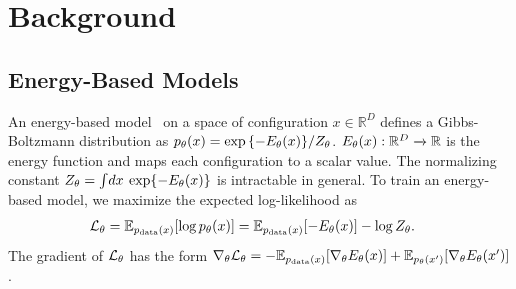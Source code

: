 \documentclass[tablecaption=bottom,wcp]{jmlr} %
\begin{document}
\section{Background}
\label{sec:background}

\subsection{Energy-Based Models}
An energy-based model~\cite{lecun2006tutorial} on a space of configuration $x\in\mathbb{R}^D$ defines a Gibbs-Boltzmann distribution as $p_\theta(x) = {\exp \left\{- E_\theta(x)\right\}} / {Z_\theta}$.
$E_\theta(x) : \mathbb{R}^D \xrightarrow[]{} \mathbb{R}$ is the energy function and maps each configuration to a scalar value. The normalizing constant $Z_\theta = \int \!dx \: \exp \{- E_\theta(x)\}$ is intractable in general.
To train an energy-based model, we maximize the expected log-likelihood as
\begin{align}
\label{eq:obj-ebm}
\mathcal{L}_{\theta} 
&= \mathbb{E}_{p_\text{data}(x)}[\log p_\theta (x)]
= \mathbb{E}_{p_\text{data}(x)}[-E_\theta (x)] - \log Z_\theta.
\end{align}
The gradient of $\mathcal{L}_\theta$ has the form $\nabla_\theta \mathcal{L}_{\theta}
=
- \mathbb{E}_{p_\text{data}(x)}[\nabla_\theta E_\theta (x)] + \mathbb{E}_{p_\theta(x')}[\nabla_\theta E_\theta(x')]
$.
\end{document}
